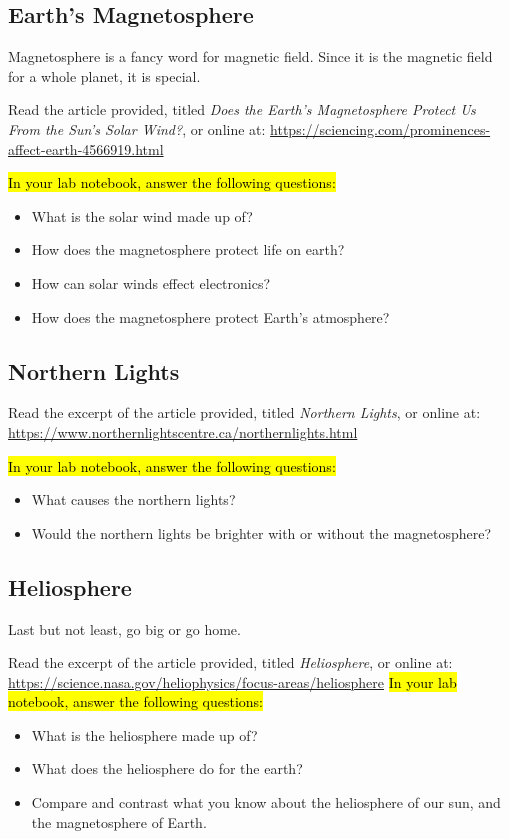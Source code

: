 \documentclass[14pt, fleqn, paper=letter, oneside]{scrartcl}
\begin{document}
\begin{multicols}{2}
\subsection{Earth's Magnetosphere}
Magnetosphere is a fancy word for magnetic field.
Since it is the magnetic field for a whole planet, it is special.

Read the article provided, titled \emph{Does the Earth's Magnetosphere Protect Us From the Sun's Solar Wind?}, or online at:
\url{https://sciencing.com/prominences-affect-earth-4566919.html}

\hl{In your lab notebook, answer the following questions:}
\begin{itemize}
\item What is the solar wind made up of?
\item How does the magnetosphere protect life on earth?
\item How can solar winds effect electronics?
\item How does the magnetosphere protect Earth's atmosphere?
\end{itemize}

\subsection{Northern Lights}
Read the excerpt of the article provided, titled \emph{Northern Lights}, or online at:
\url{https://www.northernlightscentre.ca/northernlights.html}

\hl{In your lab notebook, answer the following questions:}
\begin{itemize}
\item What causes the northern lights?
\item Would the northern lights be brighter with or without the magnetosphere?
\end{itemize}


\subsection{Heliosphere}
Last but not least, go big or go home.

Read the excerpt of the article provided, titled \emph{Heliosphere}, or online at:
\url{https://science.nasa.gov/heliophysics/focus-areas/heliosphere}
\hl{In your lab notebook, answer the following questions:}
\begin{itemize}
\item What is the heliosphere made up of?
\item What does the heliosphere do for the earth?
\item Compare and contrast what you know about the heliosphere of our sun, and the magnetosphere of Earth.
\end{itemize}

\end{multicols}
\end{document}
